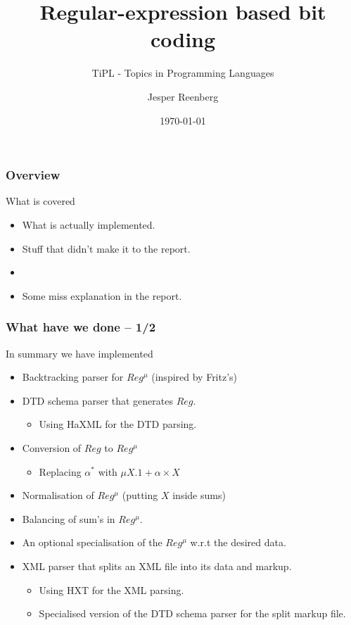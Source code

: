 \documentclass[slidestop,compress,mathserif, xcolor=table]{beamer}
\title[]{Regular-expression based bit coding}
\subtitle{\tiny{TiPL - Topics in Programming Languages}}
\author{Jesper Reenberg}
\institute[DIKU]{Department of Computer Science}
\date[]{\today}
\begin{document}
\frame[plain]{\titlepage}


\begin{frame}
  \frametitle{Overview}

  What is covered

  \begin{itemize}
  \item What is actually implemented.

  \item Stuff that didn't make it to the report.


  \item 

  \item Some miss explanation in the report.
  \end{itemize}
\end{frame}


\begin{frame}
  \frametitle{What have we done -- 1/2}

  In summary we have implemented

  \begin{itemize}
  \item Backtracking parser for $Reg^\mu$ (inspired by Fritz's)

  \item DTD schema parser that generates $Reg$.
    \begin{itemize}
    \item Using HaXML for the DTD parsing.
    \end{itemize}

  \item Conversion of $Reg$ to $Reg^\mu$
    \begin{itemize}
    \item Replacing $\alpha^\ast$ with $\mu X . 1 + \alpha \times X$
    \end{itemize}

  \item Normalisation of $Reg^\mu$ (putting $X$ inside sums)

  \item Balancing of sum's in $Reg^\mu$.

  \item An optional specialisation of the $Reg^\mu$ w.r.t the desired data.

  \item XML parser that splits an XML file into its data and markup.
    \begin{itemize}

    \item Using HXT for the XML parsing.
    \item Specialised version of the DTD schema parser for the split markup
      file.
    \end{itemize}

  \end{itemize}
\end{frame}
\end{document}
